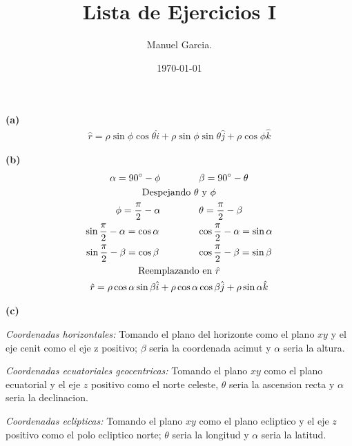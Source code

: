\documentclass{article}
\title{Lista de Ejercicios I }
\author{Manuel Garcia.}
\date{\today}
\begin{document}
\maketitle

\section{}

\hfill 

\textbf{(a)}
\begin{gather}
  \hat r = \rho \sin{\phi } \cos{\theta} \hat i + \rho \sin{\phi } \sin{\theta} \hat j + \rho \cos{\phi } \hat k 
\end{gather}

\textbf{(b)}
\begin{gather*}
  \alpha = 90\degree - \phi \qquad \qquad \beta = 90\degree - \theta \\
  \text{Despejando }\theta \text{ y } \phi\\
  \phi = \frac{\pi}{2} - \alpha \qquad \qquad \theta = \frac{\pi}{2} - \beta \\
  \sin{\frac{\pi}{2} - \alpha} = \cos{\alpha} \qquad \qquad \cos{\frac{\pi}{2} - \alpha} = \sin{\alpha}\\
  \sin{\frac{\pi}{2} - \beta} = \cos{\beta} \qquad \qquad \cos{\frac{\pi}{2} - \beta} = \sin{\beta}\\
  \text{Reemplazando en }\hat r \\
  \hat r = \rho \cos{\alpha} \sin{\beta} \hat i + \rho \cos{\alpha} \cos{\beta} \hat j + \rho \sin{\alpha} \hat k
\end{gather*}

\textbf{(c) } 

\hfill

\textit{Coordenadas horizontales:} Tomando el plano del horizonte como el plano $ xy  $ y el eje cenit como el eje z positivo; $ \beta $ seria la coordenada acimut y $ \alpha $ seria la altura.

\hfill

\textit{Coordenadas ecuatoriales geocentricas:} Tomando el plano $ xy  $ como el plano ecuatorial y el eje $ z  $ positivo como el norte celeste, $ \theta  $ seria la ascension recta y $ \alpha $ seria la declinacion.

\hfill

\textit{Coordenadas eclipticas:} Tomando el plano $ xy  $ como el plano ecliptico y el eje $ z  $ positivo como el polo ecliptico norte; $ \theta  $ seria la longitud y $ \alpha $ seria la latitud.
\end{document}
